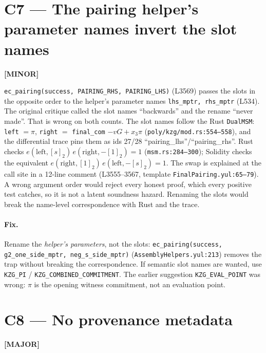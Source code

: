 \section{C7 --- The pairing helper's parameter names invert the slot names}
\label{sec:c7-naming}
\textcolor{codegenblue}{\textbf{[MINOR]}} 

\texttt{ec\_\allowbreak{}pairing(success, PAIRING\_\allowbreak{}RHS, PAIRING\_\allowbreak{}LHS)} (L3569)
passes the slots in the opposite order to the helper's parameter
names \texttt{lhs\_\allowbreak{}mptr, rhs\_\allowbreak{}mptr} (L534). The original critique
called the slot names ``backwards'' and the rename ``never made''.
That is wrong on both counts. The slot names follow the Rust
\texttt{DualMSM}: \texttt{left} $=\pi$, \texttt{right} $=$
\texttt{final\_com} $- vG + x_3\pi$ (\texttt{poly/\allowbreak{}kzg/\allowbreak{}mod.rs:554--558}),
and the differential trace pins them as ids 27/28
``pairing\_lhs''/``pairing\_rhs''. Rust checks
$e(\text{left},[s]_2)\,e(\text{right},-[1]_2)=1$ (\texttt{msm.rs:284--300});
Solidity checks the equivalent $e(\text{right},[1]_2)\,e(\text{left},-[s]_2)=1$.
The swap is explained at the call site in a 12-line comment (L3555--3567,
template \texttt{FinalPairing.yul:65--79}). A wrong argument order
would reject every honest proof, which every positive test catches,
so it is not a latent soundness hazard. Renaming the slots
would break the name-level correspondence with Rust and the trace.

\paragraph{Fix.}
Rename the \emph{helper's parameters}, not the slots:
\texttt{ec\_\allowbreak{}pairing(success, g2\_\allowbreak{}one\_\allowbreak{}side\_\allowbreak{}mptr, neg\_\allowbreak{}s\_\allowbreak{}side\_\allowbreak{}mptr)}
(\texttt{AssemblyHelpers.yul:213}) removes the trap without breaking
the correspondence. If semantic slot names are wanted, use
\texttt{KZG\_PI} / \texttt{KZG\_\allowbreak{}COMBINED\_\allowbreak{}COMMITMENT}. The earlier
suggestion \texttt{KZG\_EVAL\_POINT} was wrong: $\pi$ is the opening
witness commitment, not an evaluation point.

\section{C8 --- No provenance metadata}
\label{sec:c8-provenance}
\textcolor{mathpurple}{\textbf{[MAJOR]}} 

